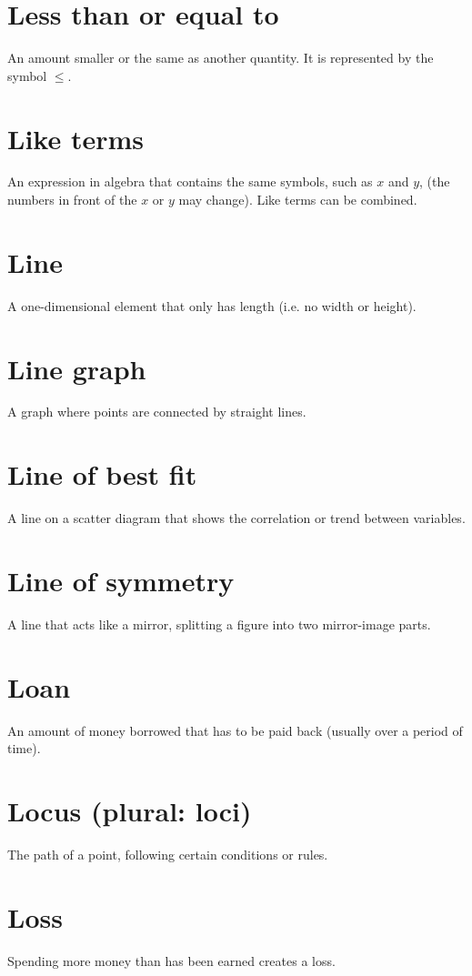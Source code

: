 \documentclass[10pt]{article}
\begin{document}
\section*{Less than or equal to}
An amount smaller or the same as another quantity. It is represented by the symbol $\leqslant$.

\section*{Like terms}
An expression in algebra that contains the same symbols, such as $x$ and $y$, (the numbers in front of the $x$ or $y$ may change). Like terms can be combined.

\section*{Line}
A one-dimensional element that only has length (i.e. no width or height).

\section*{Line graph}
A graph where points are connected by straight lines.

\section*{Line of best fit}
A line on a scatter diagram that shows the correlation or trend between variables.

\section*{Line of symmetry}
A line that acts like a mirror, splitting a figure into two mirror-image parts.

\section*{Loan}
An amount of money borrowed that has to be paid back (usually over a period of time).

\section*{Locus (plural: loci)}
The path of a point, following certain conditions or rules.

\section*{Loss}
Spending more money than has been earned creates a loss.
\end{document}
